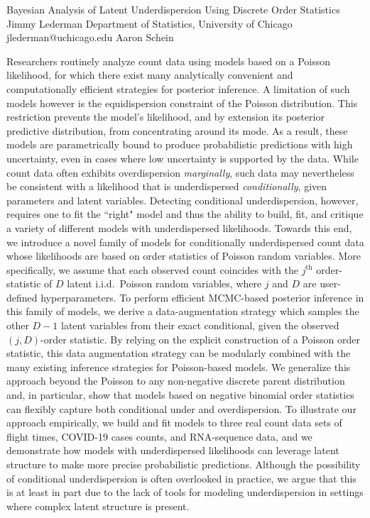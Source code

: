 \begin{talk}
  {Bayesian Analysis of Latent Underdispersion Using Discrete Order Statistics}%
  {Jimmy Lederman}%
  {Department of Statistics, University of Chicago}%
  {jlederman@uchicago.edu}%
  {Aaron Schein}%
  
    


Researchers routinely analyze count data using models based on a Poisson likelihood, for which there exist many analytically convenient and computationally efficient strategies for posterior inference. A limitation of such models however is the equidispersion constraint of the Poisson distribution. This restriction prevents the model's likelihood, and by extension its posterior predictive distribution, from concentrating around its mode. As a result, these models are parametrically bound to produce probabilistic predictions with high uncertainty, even in cases where low uncertainty is supported by the data. While count data often exhibits overdispersion \textit{marginally}, such data may nevertheless be consistent with a likelihood that is underdispersed \textit{conditionally}, given parameters and latent variables. Detecting conditional underdispersion, however, requires one to fit the ``right" model and thus the ability to build, fit, and critique a variety of different models with underdispersed likelihoods. Towards this end, we introduce a novel family of models for conditionally underdispersed count data whose likelihoods are based on order statistics of Poisson random variables. More specifically, we assume that each observed count coincides with the $j^{\textrm{th}}$ order-statistic of $D$ latent i.i.d.~Poisson random variables, where $j$ and $D$ are user-defined hyperparameters. To perform efficient MCMC-based posterior inference in this family of models, we derive a data-augmentation strategy which samples the other $D{-}1$ latent variables from their exact conditional, given the observed $(j,D)$-order statistic. By relying on the explicit construction of a Poisson order statistic, this data augmentation strategy can be modularly combined with the many existing inference strategies for Poisson-based models. We generalize this approach beyond the Poisson to any non-negative discrete parent distribution and, in particular, show that models based on negative binomial order statistics can flexibly capture both conditional under and overdispersion.  To illustrate our approach empirically, we build and fit models to three real count data sets of flight times, COVID-19 cases counts, and RNA-sequence data, and we demonstrate how models with underdispersed likelihoods can leverage latent structure to make more precise probabilistic predictions. Although the possibility of conditional underdispersion is often overlooked in practice, we argue that this is at least in part due to the lack of tools for modeling underdispersion in settings where complex latent structure is present.


\end{talk}
